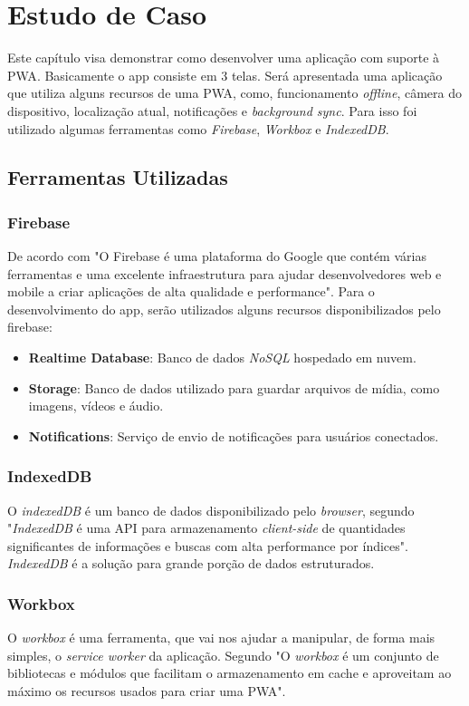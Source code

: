 \chapter{\textbf{Estudo de Caso}}
Este capítulo visa demonstrar como desenvolver uma aplicação com suporte à \ac{PWA}. Basicamente o app consiste em 3 telas. Será apresentada uma aplicação que utiliza alguns recursos de uma \ac{PWA}, como, funcionamento \textit{offline}, câmera do dispositivo, localização atual, notificações e \textit{background sync}. Para isso foi utilizado algumas ferramentas como \textit{Firebase}, \textit{Workbox} e \textit{IndexedDB}.

\section{Ferramentas Utilizadas}
\subsection*{Firebase}
De acordo com \cite{firebase} "O Firebase é uma plataforma do Google que contém várias ferramentas e uma excelente infraestrutura para ajudar desenvolvedores web e mobile a criar aplicações de alta qualidade e performance". Para o desenvolvimento do app, serão utilizados alguns recursos disponibilizados pelo firebase:

\begin{itemize}
	\item \textbf{Realtime Database}: Banco de dados \textit{NoSQL} hospedado em nuvem.
	\item \textbf{Storage}: Banco de dados utilizado para guardar arquivos de mídia, como imagens, vídeos e áudio.
	\item \textbf{Notifications}: Serviço de envio de notificações para usuários conectados.
\end{itemize}

\subsection*{IndexedDB}
O \textit{indexedDB} é um banco de dados disponibilizado pelo \textit{browser}, segundo \cite{indexdb} "\textit{IndexedDB} é uma \ac{API} para armazenamento \textit{client-side} de quantidades significantes de informações e buscas com alta performance por índices". \textit{IndexedDB} é a solução para grande porção de dados estruturados.

\subsection*{Workbox}
O \textit{workbox} é uma ferramenta, que vai nos ajudar a manipular, de forma mais simples, o \textit{service worker} da aplicação. Segundo \cite{workbox} "O \textit{workbox} é um conjunto de bibliotecas e módulos que facilitam o armazenamento em cache e aproveitam ao máximo os recursos usados para criar uma \ac{PWA}".

